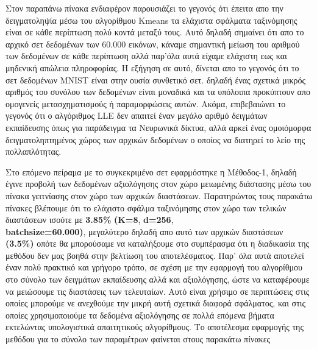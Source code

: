 \par
Στον παραπάνω πίνακα ενδιαφέρον παρουσιάζει το γεγονός ότι έπειτα απο την δειγματοληψία μέσω του αλγορίθμου \textlatin{Kmeans}\textlatin{\cite{kmeans}} τα ελάχιστα σφάλματα ταξινόμησης είναι σε κάθε περίπτωση πολύ κοντά μεταξύ τους. Αυτό δηλαδή σημαίνει ότι απο το αρχικό σετ δεδομένων των 60.000 εικόνων, κάναμε σημαντική μείωση του αριθμού των δεδομένων σε κάθε περίπτωση αλλά παρ'όλα αυτά είχαμε ελάχιστη εως και μηδενική απώλεια πληροφορίας. Η εξήγηση σε αυτό, δίνεται απο το γεγονός ότι το σετ δεδομένων \textlatin{MNIST}\textlatin{\cite{mnist}} είναι στην ουσία συνθετικό σετ. δηλαδή ένας σχετικά μικρός αριθμός του συνόλου των δεδομένων είναι μοναδικά και τα υπόλοιπα προκύπτουν απο ομογενείς μετασχηματισμούς ή παραμορφώσεις αυτών. Ακόμα, επιβεβαιώνει το γεγονός ότι ο αλγόριθμος \textlatin{LLE} δεν απαιτεί έναν μεγάλο αριθμό δειγμάτων εκπαίδευσης όπως για παράδειγμα τα Νευρωνικά δίκτυα, αλλά αρκεί ένας ομοιόμορφα δειγματοληπτημένος χώρος των αρχικών δεδομένων ο οποίος να διατηρεί το λείο της πολλαπλότητας.
\par
Στο επόμενο πείραμα με το συγκεκριμένο σετ εφαρμόστηκε η Μέθοδος-1, δηλαδή έγινε προβολή των δεδομένων αξιολόγησης στον χώρο μειωμένης διάστασης μέσω του πίνακα γειτνίασης στον χώρο των αρχικών διαστάσεων. Παρατηρώντας τους παρακάτω πίνακες βλέπουμε ότι το ελάχιστο σφάλμα ταξινόμησης στον χώρο των τελικών διαστάσεων ισούτε με \textbf{3.85\%} \textbf{(\textlatin{K}=8}, \textbf{\textlatin{d}=256}, \\ \textbf{\textlatin{batch\textunderscore size=60.000})}, μεγαλύτερο δηλαδή απο αυτό των αρχικών διαστάσεων \textbf{(3.5\%)} οπότε θα μπορούσαμε να καταλήξουμε στο συμπέρασμα ότι η διαδικασία της μεθόδου δεν μας βοηθά στην βελτίωση του αποτελέσματος. Παρ' όλα αυτά αποτελεί έναν πολύ πρακτικό και γρήγορο τρόπο, σε σχέση με την εφαρμογή του αλγορίθμου στο σύνολο των δειγμάτων εκπαίδευσης αλλά και αξιολόγησης, ώστε να καταφέρουμε να μειώσουμε τις διαστάσεις των τελευταίων. Αυτό είναι χρήσιμο σε περιπτώσεις στις οποίες μπορούμε νε ανεχθούμε την μικρή αυτή σχετικά διαφορά σφάλματος, και στις οποίες χρησιμοποιούμε τα δεδομένα αξιολόγησης σε πολλά επόμενα βήματα εκτελώντας υπολογιστικά απαιτητικούς αλγορίθμους. Το αποτέλεσμα εφαρμογής της μεθόδου για το σύνολο των παραμέτρων φαίνεται στους παρακάτω πίνακες

